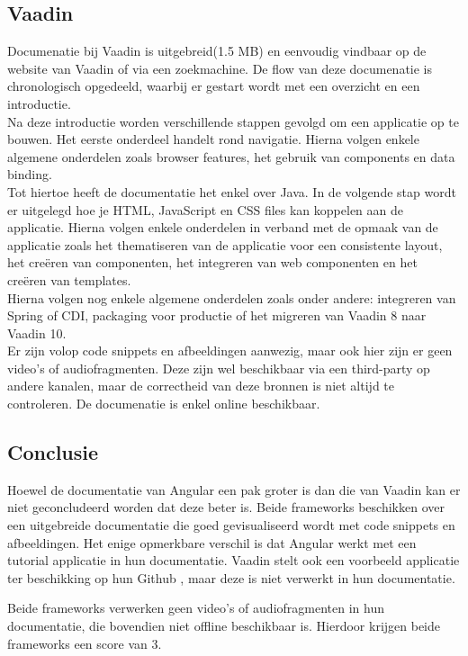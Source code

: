 \subsection{Vaadin}
Documenatie bij Vaadin is uitgebreid(1.5 MB) en eenvoudig vindbaar op de website van Vaadin of via een zoekmachine. De flow van deze documenatie is chronologisch opgedeeld, waarbij er gestart wordt met een overzicht en een introductie. \\
Na deze introductie worden verschillende stappen gevolgd om een applicatie op te bouwen. Het eerste onderdeel handelt rond navigatie. Hierna volgen enkele algemene onderdelen zoals browser features, het gebruik van components en data binding. \\ 
Tot hiertoe heeft de documentatie het enkel over Java. In de volgende stap wordt er uitgelegd hoe je HTML, JavaScript en CSS files kan koppelen aan de applicatie. 
Hierna volgen enkele onderdelen in verband met de opmaak van de applicatie zoals het thematiseren van de applicatie voor een consistente layout, het creëren van componenten, het integreren van web componenten en het creëren van templates. \\
Hierna volgen nog enkele algemene onderdelen zoals onder andere: integreren van Spring of CDI, packaging voor productie of het migreren van Vaadin 8 naar Vaadin 10. \\

Er zijn volop code snippets en afbeeldingen aanwezig, maar ook hier zijn er geen video's of audiofragmenten. Deze zijn wel beschikbaar via een third-party op andere kanalen, maar de correctheid van deze bronnen is niet altijd te controleren. De documenatie is enkel online beschikbaar.

\subsection{Conclusie}
Hoewel de documentatie van Angular een pak groter is dan die van Vaadin kan er niet geconcludeerd worden dat deze beter is. Beide frameworks beschikken over een uitgebreide documentatie die goed gevisualiseerd wordt met code snippets en afbeeldingen. Het enige opmerkbare verschil is dat Angular werkt met een tutorial applicatie in hun documentatie. Vaadin stelt ook een voorbeeld applicatie ter beschikking op hun Github \autocite{VaadinDemo2019}, maar deze is niet verwerkt in hun documentatie.

Beide frameworks verwerken geen video's of audiofragmenten in hun documentatie, die bovendien niet offline beschikbaar is. Hierdoor krijgen beide frameworks een score van 3.


